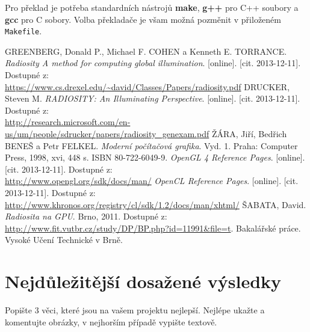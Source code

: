 \documentclass[11pt,a4paper]{article}
\begin{document}
Pro překlad je potřeba standardních nástrojů \textbf{make}, \textbf{g++} pro C++ soubory a \textbf{gcc} pro C sobory. Volba překladače je všam možná pozměnit v přiloženém \texttt{Makefile}.



\def\refname{\section{Použité zdroje}}
\begin{thebibliography}{9}
   GREENBERG, Donald P., Michael F. COHEN a Kenneth E. TORRANCE.
    \emph{Radiosity A method for computing global illumination}. [online]. [cit. 2013-12-11]. Dostupné z:\\
    \url{https://www.cs.drexel.edu/~david/Classes/Papers/radiosity.pdf}
   DRUCKER, Steven M.
    \emph{RADIOSITY: An Illuminating Perspective}. [online]. [cit. 2013-12-11]. Dostupné z:\\
    \url{http://research.microsoft.com/en-us/um/people/sdrucker/papers/radiosity_genexam.pdf}
   ŽÁRA, Jiří, Bedřich BENEŠ a Petr FELKEL.
    \emph{Moderní počítačová grafika}. Vyd. 1. Praha: Computer Press, 1998, xvi, 448 s. ISBN 80-722-6049-9.
    \emph{OpenGL 4 Reference Pages}. [online]. [cit. 2013-12-11]. Dostupné z:\\
    \url{http://www.opengl.org/sdk/docs/man/}
    \emph{OpenCL Reference Pages}. [online]. [cit. 2013-12-11]. Dostupné z:\\
    \url{http://www.khronos.org/registry/cl/sdk/1.2/docs/man/xhtml/}
   ŠABATA, David.
    \emph{Radiosita na GPU}. Brno, 2011. Dostupné z:\\
    \url{http://www.fit.vutbr.cz/study/DP/BP.php?id=11991&file=t}.
    Bakalářské práce. Vysoké Učení Technické v Brně.
\end{thebibliography}

\section{Nejdůležitější dosažené výsledky}

Popište 3 věci, které jsou na vašem projektu nejlepší. Nejlépe ukažte a
komentujte obrázky, v nejhorším případě vypište textově.
\end{document}
